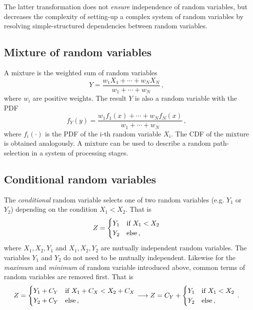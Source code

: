 The latter transformation does not \emph{ensure} independence of random variables, but 
decreases the complexity of setting-up a complex system of random variables by 
resolving simple-structured dependencies between random variables.

\subsection{Mixture of random variables}
A mixture is the weighted sum of random variables
\begin{equation}
 Y = \frac{w_1X_1+\cdots+w_NX_N}{w_1+\cdots+w_N}\,, \nonumber
\end{equation}
where $w_i$ are positive weights. The result $Y$ is also a random variable with the PDF
\begin{equation}
 f_Y(y) = \frac{w_1f_1(x)+\cdots+w_Nf_N(x)}{w_1+\cdots+w_N}\,,\nonumber
\end{equation}
where $f_i(\cdot)$ is the PDF of the i-th random variable $X_i$. The CDF of the
mixture is obtained analogously. A mixture can be used to describe a random 
path-selection in a system of processing stages. 

\subsection{Conditional random variables}
The \emph{conditional} random variable selects one of two random variables (e.g. $Y_1$ or $Y_2$) depending
on the condition $X_1 < X_2$. That is 
\begin{equation}
 Z = \begin{cases}
   Y_1 & \mbox{if } X_1 < X_2\\
   Y_2 & \mbox{else\,,} 
 \end{cases} \nonumber
\end{equation}
where $X_1, X_2, Y_1$ and $X_1, X_2, Y_2$ are mutually independent random variables. The variables
$Y_1$ and $Y_2$ do not need to be mutually independent. Likewise for the \emph{maximum} and 
\emph{minimum} of random variable introduced above, common terms of random variables are 
removed first. That is
\begin{equation}
 Z = \begin{cases}
   Y_1+C_Y & \mbox{if } X_1+C_X < X_2+C_X\\
   Y_2+C_Y & \mbox{else\,,} 
 \end{cases} \longrightarrow
 Z = C_Y + \begin{cases}
   Y_1 & \mbox{if } X_1 < X_2\\
   Y_2 & \mbox{else\,,} 
 \end{cases}\,.\nonumber
\end{equation}

